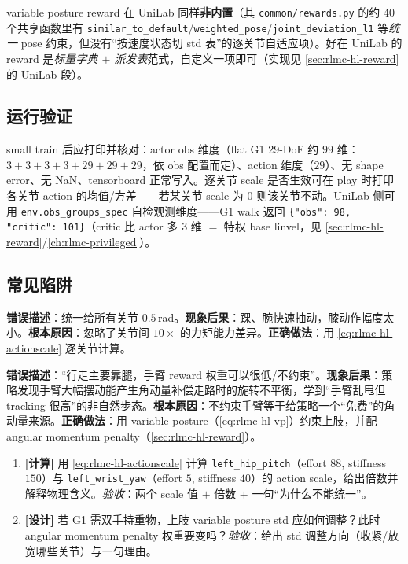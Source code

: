 variable posture reward 在 UniLab 同样\textbf{非内置}（其 \texttt{common/rewards.py} 的约 40 个共享函数里有 \texttt{similar\_to\_default}/\texttt{weighted\_pose}/\texttt{joint\_deviation\_l1} 等\emph{统一} pose 约束，但没有“按速度状态切 std 表”的逐关节自适应项）。好在 UniLab 的 reward 是\emph{标量字典 $+$ 派发表}范式，自定义一项即可（实现见 \cref{sec:rlmc-hl-reward} 的 UniLab 段）。

\subsection{运行验证}
small train 后应打印并核对：actor obs 维度（flat G1 29-DoF 约 $99$ 维：$3+3+3+3+29+29+29$，依 obs 配置而定）、action 维度（$29$）、无 shape error、无 NaN、tensorboard 正常写入。逐关节 scale 是否生效可在 play 时打印各关节 action 的均值/方差——若某关节 scale 为 $0$ 则该关节不动。UniLab 侧可用 \texttt{env.obs\_groups\_spec} 自检观测维度——G1 walk 返回 \texttt{\{"obs": 98, "critic": 101\}}（critic 比 actor 多 $3$ 维 $=$ 特权 base linvel，见 \cref{sec:rlmc-hl-reward}/\cref{ch:rlmc-privileged}）。

\subsection{常见陷阱}
\begin{pitfall}
\textbf{错误描述}：统一给所有关节 $0.5$\,rad。\textbf{现象后果}：踝、腕快速抽动，膝动作幅度太小。\textbf{根本原因}：忽略了关节间 $10\times$ 的力矩能力差异。\textbf{正确做法}：用 \eqref{eq:rlmc-hl-actionscale} 逐关节计算。
\end{pitfall}

\begin{pitfall}[把手臂当成不重要的关节]
\textbf{错误描述}：“行走主要靠腿，手臂 reward 权重可以很低/不约束”。\textbf{现象后果}：策略发现手臂大幅摆动能产生角动量补偿走路时的旋转不平衡，学到“手臂乱甩但 tracking 很高”的非自然步态。\textbf{根本原因}：不约束手臂等于给策略一个“免费”的角动量来源。\textbf{正确做法}：用 variable posture（\eqref{eq:rlmc-hl-vp}）约束上肢，并配 angular momentum penalty（\cref{sec:rlmc-hl-reward}）。
\end{pitfall}

\begin{practice}[本节动手]
\begin{enumerate}
  \item \textbf{[计算]} 用 \eqref{eq:rlmc-hl-actionscale} 计算 \texttt{left\_hip\_pitch}（effort $88$, stiffness $150$）与 \texttt{left\_wrist\_yaw}（effort $5$, stiffness $40$）的 action scale，给出倍数并解释物理含义。\emph{验收}：两个 scale 值 $+$ 倍数 $+$ 一句“为什么不能统一”。
  \item \textbf{[设计]} 若 G1 需双手持重物，上肢 variable posture std 应如何调整？此时 angular momentum penalty 权重要变吗？\emph{验收}：给出 std 调整方向（收紧/放宽哪些关节）与一句理由。
\end{enumerate}
\end{practice}


